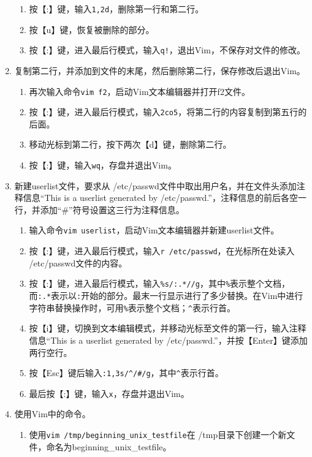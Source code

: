\begin{enumerate}
\begin{enumerate}
      \item 按【:】键，输入\verb|1,2d|，删除第一行和第二行。
      \item 按【u】键，恢复被删除的部分。
      \item 按【:】键，进入最后行模式，输入\verb|q!|，退出Vim，不保存对文件的修改。
    \end{enumerate}
  \item 复制第二行，并添加到文件的末尾，然后删除第二行，保存修改后退出Vim。
    \begin{enumerate}
      \item 再次输入命令\verb|vim f2|，启动Vim文本编辑器并打开f2文件。
      \item 按【:】键，进入最后行模式，输入\verb|2co5|，将第二行的内容复制到第五行的后面。
      \item 移动光标到第二行，按下两次【d】键，删除第二行。
      \item 按【:】键，输入\verb|wq|，存盘并退出Vim。
    \end{enumerate}
  \item 新建userlist文件，要求从 /etc/passwd文件中取出用户名，并在文件头添加注释信息“This is a userlist generated by /etc/passwd.”，注释信息的前后各空一行，并添加“\#”符号设置这三行为注释信息。
    \begin{enumerate}
      \item 输入命令\verb|vim userlist|，启动Vim文本编辑器并新建userlist文件。
      \item 按【:】键，进入最后行模式，输入\verb|r /etc/passwd|，在光标所在处读入 /etc/passwd文件的内容。
      \item 按【:】键，进入最后行模式，输入\verb|%s/:.*//g|，其中\verb|%|表示整个文档，而\verb|:.*|表示以\verb|:|开始的部分。最末一行显示进行了多少替换。在Vim中进行字符串替换操作时，可用\verb|%|表示整个文档；\verb|^|表示行首。
      \item 按【i】键，切换到文本编辑模式，并移动光标至文件的第一行，输入注释信息“This is a userlist generated by /etc/passwd.”，并按【Enter】键添加两行空行。
      \item 按【Esc】键后输入\verb|:1,3s/^/#/g|，其中\verb|^|表示行首。
      \item 最后按【:】键，输入\verb|x|，存盘并退出Vim。
    \end{enumerate}
  \item 使用Vim中的命令。
    \begin{enumerate}
      \item 使用\verb|vim /tmp/beginning_unix_testfile|在 /tmp目录下创建一个新文件，命名为beginning\_unix\_testfile。

\end{enumerate}
\end{enumerate}
